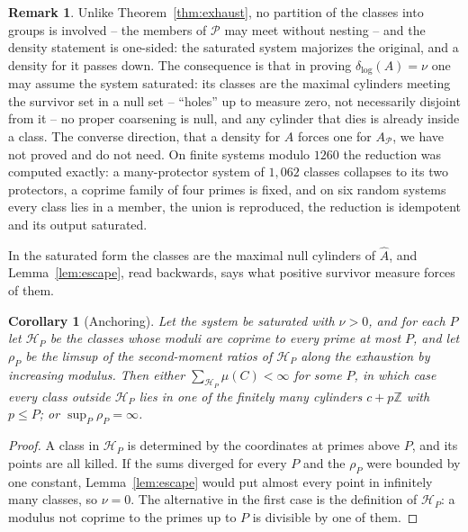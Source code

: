 \documentclass[11pt]{article}
\theoremstyle{plain}
\newtheorem{corollary}[theorem]{Corollary}
\theoremstyle{definition}
\newtheorem{remark}[theorem]{Remark}
\newcommand{\dlog}{\delta_{\log}}
\newcommand{\Ahat}{\widehat{A}}
\begin{document}
\begin{remark}
Unlike Theorem~\ref{thm:exhaust}, no partition of the classes
into groups is involved -- the members of $\mathcal{P}$ may meet
without nesting -- and the density statement is one-sided: the
saturated system majorizes the original, and a density for it
passes down.  The consequence is that in proving $\dlog(A)=\nu$
one may assume the system saturated: its classes are the maximal
cylinders meeting the survivor set in a null set -- ``holes'' up
to measure zero, not necessarily disjoint from it -- no proper
coarsening is null, and any cylinder that dies is already inside
a class.  The
converse direction, that a density for $A$ forces one for
$A_{\mathcal{P}}$, we have not proved and do not need.  On
finite systems modulo $1260$ the reduction was computed exactly:
a many-protector system of $1{,}062$ classes collapses to its two
protectors, a coprime family of four primes is fixed, and on six
random systems every class lies in a member, the union is
reproduced, the reduction is idempotent and its output saturated.
\end{remark}

In the saturated form the classes are the maximal null cylinders of $\Ahat$, and
Lemma~\ref{lem:escape}, read backwards, says what positive
survivor measure forces of them.

\begin{corollary}[Anchoring]\label{cor:anchor}
Let the system be saturated with $\nu>0$, and for each $P$ let
$\mathcal{H}_P$ be the classes whose moduli are coprime to every
prime at most $P$, and let $\rho_P$ be the limsup of the
second-moment ratios of $\mathcal{H}_P$ along the exhaustion by
increasing modulus.  Then either $\sum_{\mathcal{H}_P}\mu(C)<\infty$
for some $P$, in which case every class outside
$\mathcal{H}_P$ lies in one of the finitely many cylinders
$c+p\mathbb{Z}$ with $p\le P$; or $\sup_P\rho_P=\infty$.
\end{corollary}

\begin{proof}
A class in $\mathcal{H}_P$ is determined by the coordinates at
primes above $P$, and its points are all killed.  If the sums
diverged for every $P$ and the $\rho_P$ were bounded by one
constant, Lemma~\ref{lem:escape} would put almost every point in
infinitely many classes, so $\nu=0$.  The alternative in the
first case is the definition of $\mathcal{H}_P$: a modulus not
coprime to the primes up to $P$ is divisible by one of them.
\end{proof}
\end{document}
